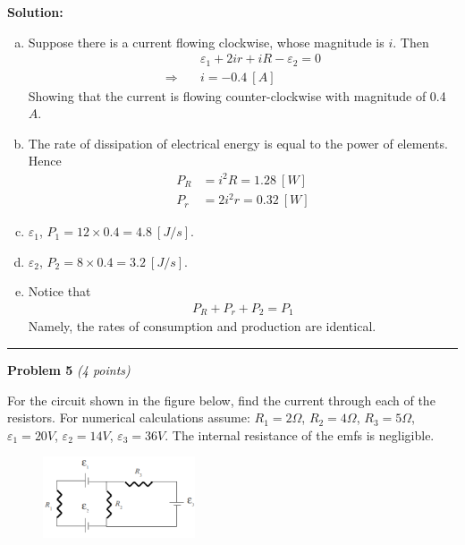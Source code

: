 \documentclass[a4paper, 11pt]{article}
\newenvironment{problem}[3][Problem]
    { \begin{mdframed}[backgroundcolor=gray!20] \textbf{#1 #2} \textit{(#3 points)} }
    {  \end{mdframed}}
\newenvironment{solution}
    {\textbf{Solution:}}
    {}
\begin{document}
\begin{solution}
	\begin{enumerate}[(a)]
		\item Suppose there is a current flowing clockwise, whose magnitude is $i$. Then
		      \begin{align}
			                        & \varepsilon_1 + 2ir + iR - \varepsilon_2 = 0 \\
			      \Rightarrow \quad & i = -0.4\ [A]
		      \end{align}
		      Showing that the current is flowing counter-clockwise with magnitude of 0.4 $A$.
		\item The rate of dissipation of electrical energy is equal to the power of elements. Hence
		      \begin{align*}
			      P_R & = i^2 R = 1.28\ [W]  \\
			      P_r & = 2i^2 r = 0.32\ [W]
		      \end{align*}
		\item $\varepsilon_1$, $P_1 = 12 \times 0.4 = 4.8\ [J/s]$.
		\item $\varepsilon_2$, $P_2 = 8 \times 0.4 = 3.2\ [J/s]$.
		\item Notice that 
              \begin{align}
                P_R + P_r + P_2 = P_1
              \end{align}
              Namely, the rates of consumption and production are identical.
	\end{enumerate}

\end{solution}


\noindent\rule{7.1in}{2.8pt}

\begin{problem}{5}{4}
\par For the circuit shown in the figure below, find the current through each of the resistors. For numerical calculations assume: $R_1=2\Omega$, $R_2=4\Omega$, $R_3=5\Omega$, $\varepsilon_1=20V$,
$\varepsilon_2=14V$, $\varepsilon_3=36V$. The internal resistance of the emfs is negligible.
\end{problem}
\begin{figure}[!htbp]
	\begin{small}
		\begin{center}
			\includegraphics[width=0.4\textwidth]{hw5_p5_question.png}
		\end{center}
	\end{small}
\end{figure}
\end{document}
